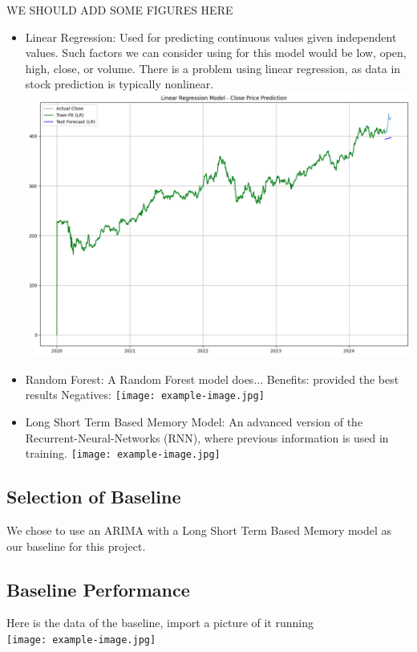 \documentclass[conference]{IEEEtran}
\begin{document}
WE SHOULD ADD SOME FIGURES HERE

\begin{itemize}
\item{Linear Regression: }
Used for predicting continuous values given independent values.  Such factors we can consider using for this model would be low, open, high, close, or volume.  There is a problem using linear regression, as data in stock prediction is typically nonlinear.
\includegraphics[scale=0.25]{linreg.png} %

\item{Random Forest: }
A Random Forest model does...  Benefits:  provided the best results Negatives:
\texttt{[image: example-image.jpg]} %

\item{Long Short Term Based Memory Model: }
An advanced version of the Recurrent-Neural-Networks (RNN), where previous information is used in training.  
\texttt{[image: example-image.jpg]} %

\end{itemize}

\subsection{Selection of Baseline}
We chose to use an ARIMA with a Long Short Term Based Memory model as our baseline for this project.

\subsection{Baseline Performance}
Here is the data of the baseline, import a picture of it running
\\
\texttt{[image: example-image.jpg]}
\end{document}
